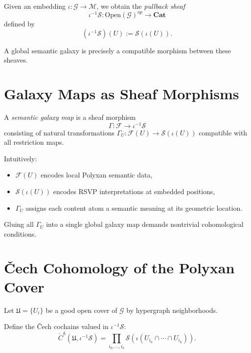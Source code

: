 Given an embedding $\iota:\mathcal{G}\to\mathcal{M}$,
we obtain the \emph{pullback sheaf}
\[
  \iota^{-1}\mathscr{S}: \mathrm{Open}(\mathcal{G})^{op}\to \mathbf{Cat}
\]
defined by
\[
  (\iota^{-1}\mathscr{S})(U)
  := \mathscr{S}(\iota(U)).
\]

A global semantic galaxy is precisely a compatible morphism between these sheaves.

\section{Galaxy Maps as Sheaf Morphisms}

\begin{definition}
A \emph{semantic galaxy map} is a sheaf morphism
\[
  \Gamma : \mathcal{F} \longrightarrow \iota^{-1}\mathscr{S}
\]
consisting of natural transformations
\(
  \Gamma_U : \mathcal{F}(U) \to \mathscr{S}(\iota(U))
\)
compatible with all restriction maps.
\end{definition}

Intuitively:

\begin{itemize}
  \item $\mathcal{F}(U)$ encodes local Polyxan semantic data,
  \item $\mathscr{S}(\iota(U))$ encodes RSVP interpretations at embedded positions,
  \item $\Gamma_U$ assigns each content atom a semantic meaning at its geometric location.
\end{itemize}

Gluing all $\Gamma_U$ into a single global galaxy map demands nontrivial
cohomological conditions.

\section{Čech Cohomology of the Polyxan Cover}

Let $\mathfrak{U}=\{U_i\}$ be a good open cover of $\mathcal{G}$ by hypergraph neighborhoods.

Define the Čech cochains valued in $\iota^{-1}\mathscr{S}$:
\[
  \check{C}^k(\mathfrak{U},\iota^{-1}\mathscr{S})
  =
  \prod_{i_0,\dots,i_k}
    \mathscr{S}(\iota(U_{i_0}\cap\cdots\cap U_{i_k})).
\]

